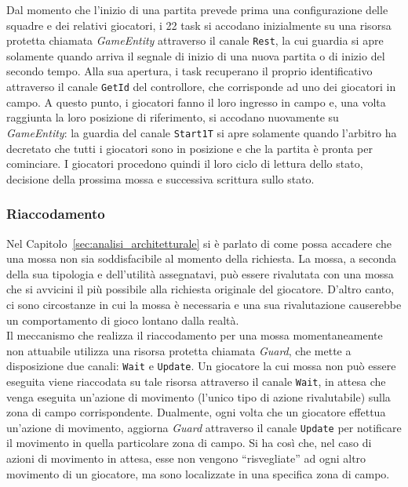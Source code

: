 Dal momento che l'inizio di una partita prevede prima una configurazione delle squadre e dei relativi giocatori, i 22 task si accodano inizialmente su una risorsa protetta chiamata \emph{GameEntity} attraverso il canale \verb+Rest+, la cui guardia si apre solamente quando arriva il segnale di inizio di una nuova partita o di inizio del secondo tempo. Alla sua apertura, i task recuperano il proprio identificativo attraverso il canale \verb+GetId+ del controllore, che corrisponde ad uno dei giocatori in campo. A questo punto, i giocatori fanno il loro ingresso in campo e, una volta raggiunta la loro posizione di riferimento, si accodano nuovamente su \emph{GameEntity}: la guardia del canale \verb+Start1T+ si apre solamente quando l'arbitro ha decretato che tutti i giocatori sono in posizione e che la partita è pronta per cominciare. I giocatori procedono quindi il loro ciclo di lettura dello stato, decisione della prossima mossa e successiva scrittura sullo stato.\\

\subsubsection{Riaccodamento}
\label{sec:implementazione_concorrenza_riaccodamento}

Nel Capitolo~\ref{sec:analisi_architetturale} si è parlato di come possa accadere che una mossa non sia soddisfacibile al momento della richiesta. La mossa, a seconda della sua tipologia e dell'utilità assegnatavi, può essere rivalutata con una mossa che si avvicini il più possibile alla richiesta originale del giocatore. D'altro canto, ci sono circostanze in cui la mossa è necessaria e una sua rivalutazione causerebbe un comportamento di gioco lontano dalla realtà.\\

Il meccanismo che realizza il riaccodamento per una mossa momentaneamente non attuabile utilizza una risorsa protetta chiamata \emph{Guard}, che mette a disposizione due canali: \verb+Wait+ e \verb+Update+. Un giocatore la cui mossa non può essere eseguita viene riaccodata su tale risorsa attraverso il canale \verb+Wait+, in attesa che venga eseguita un'azione di movimento (l'unico tipo di azione rivalutabile) sulla zona di campo corrispondente. Dualmente, ogni volta che un giocatore effettua un'azione di movimento, aggiorna \emph{Guard} attraverso il canale \verb+Update+ per notificare il movimento in quella particolare zona di campo. Si ha così che, nel caso di azioni di movimento in attesa, esse non vengono ``risvegliate'' ad ogni altro movimento di un giocatore, ma sono localizzate in una specifica zona di campo.\\

